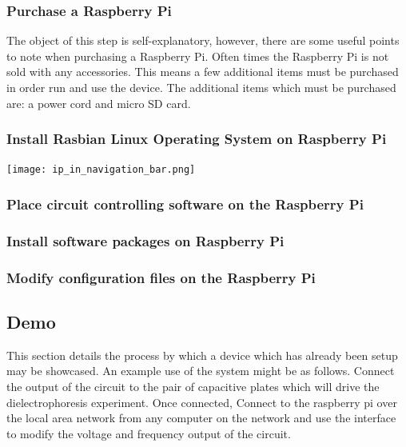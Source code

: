 \documentclass{article}	%
\begin{document}
\begin{multicols}{2}
\subsubsection{Purchase a Raspberry Pi}
The object of this step is self-explanatory, however,
there are some useful points to note when purchasing
a Raspberry Pi.
Often times the Raspberry Pi is not sold with any accessories.
This means a few additional items must be purchased
in order run and use the device.
The additional items which must be purchased are:
a power cord and
micro SD card.

\subsubsection{Install Rasbian Linux Operating System on Raspberry Pi}

\begin{center}
\texttt{[image: ip\_in\_navigation\_bar.png]}
\end{center}

\subsubsection{Place circuit controlling software on the Raspberry Pi}

\subsubsection{Install software packages on Raspberry Pi}

\subsubsection{Modify configuration files on the Raspberry Pi}

\subsection{Demo}
This section details the process
by which a device which has already
been setup may be showcased.
An example use of the system might be as follows.
Connect the output of the circuit to the pair
of capacitive plates which will drive 
the dielectrophoresis experiment.
Once connected,
Connect to the raspberry pi over
the local area network from
any computer on the network and
use the interface to modify the
voltage and frequency output of the circuit.


\end{multicols}
\end{document}
